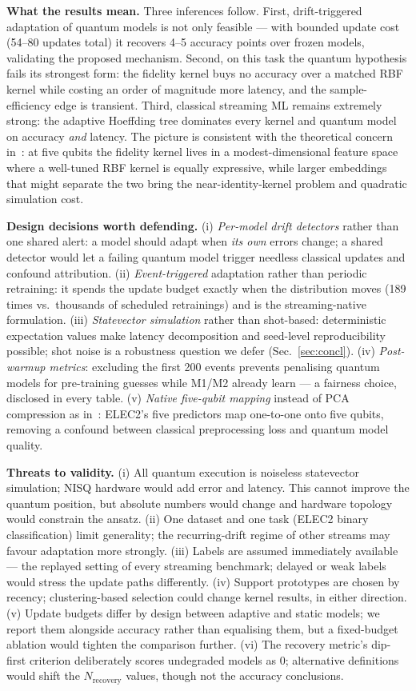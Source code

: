\documentclass[conference]{IEEEtran}
\begin{document}
\textbf{What the results mean.} Three inferences follow. First, drift-triggered adaptation
of quantum models is not only feasible --- with bounded update cost (54--80 updates total)
it recovers 4--5 accuracy points over frozen models, validating the proposed mechanism.
Second, on this task the quantum hypothesis fails its strongest form: the fidelity kernel
buys no accuracy over a matched RBF kernel while costing an order of magnitude more
latency, and the sample-efficiency edge is transient. Third, classical streaming ML
remains extremely strong: the adaptive Hoeffding tree dominates every kernel and quantum
model on accuracy \emph{and} latency. The picture is consistent with the theoretical
concern in~\cite{schuld2019}: at five qubits the fidelity kernel lives in a
modest-dimensional feature space where a well-tuned RBF kernel is equally expressive, while
larger embeddings that might separate the two bring the near-identity-kernel problem and
quadratic simulation cost.

\textbf{Design decisions worth defending.}
(i) \emph{Per-model drift detectors} rather than one shared alert: a model should adapt
when \emph{its own} errors change; a shared detector would let a failing quantum model
trigger needless classical updates and confound attribution.
(ii) \emph{Event-triggered} adaptation rather than periodic retraining: it spends the
update budget exactly when the distribution moves (189 times vs.\ thousands of scheduled
retrainings) and is the streaming-native formulation.
(iii) \emph{Statevector simulation} rather than shot-based: deterministic expectation
values make latency decomposition and seed-level reproducibility possible; shot noise is a
robustness question we defer (Sec.~\ref{sec:concl}).
(iv) \emph{Post-warmup metrics}: excluding the first 200 events prevents penalising
quantum models for pre-training guesses while M1/M2 already learn --- a fairness choice,
disclosed in every table.
(v) \emph{Native five-qubit mapping} instead of PCA compression as in~\cite{herbst2024}:
ELEC2's five predictors map one-to-one onto five qubits, removing a confound between
classical preprocessing loss and quantum model quality.

\textbf{Threats to validity.} (i) All quantum execution is noiseless statevector
simulation; NISQ hardware would add error and latency. This cannot improve the quantum
position, but absolute numbers would change and hardware topology would constrain the
ansatz. (ii) One dataset and one task (ELEC2 binary classification) limit generality;
the recurring-drift regime of other streams may favour adaptation more strongly.
(iii) Labels are assumed immediately available --- the replayed setting of every streaming
benchmark; delayed or weak labels would stress the update paths differently.
(iv) Support prototypes are chosen by recency; clustering-based selection could change
kernel results, in either direction. (v) Update budgets differ by design between adaptive
and static models; we report them alongside accuracy rather than equalising them, but a
fixed-budget ablation would tighten the comparison further. (vi) The recovery metric's
dip-first criterion deliberately scores undegraded models as 0; alternative definitions
would shift the $N_{\text{recovery}}$ values, though not the accuracy conclusions.
\end{document}
